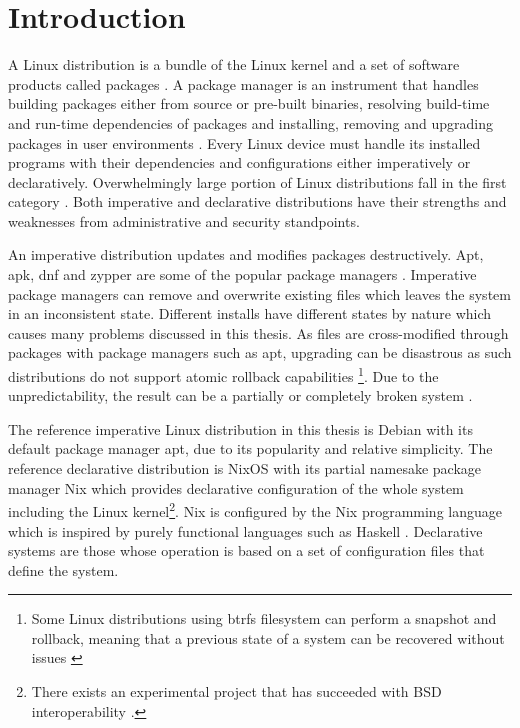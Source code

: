 \chapter{Introduction} \label{johdanto}

A Linux distribution is a bundle of the Linux kernel and a set of
software products called packages \cite{gnuPackagesx2014}.  A package
manager is an instrument that handles building packages either
from source or pre-built binaries, resolving build-time and run-time
dependencies of packages and installing, removing and upgrading
packages in user environments \cite{gnuPackagesx2014}. Every Linux
device must handle its installed programs with their dependencies and
configurations either imperatively or declaratively. Overwhelmingly
large portion of Linux distributions fall in the first category
\cite{dolstra2008nixos}. Both imperative and declarative distributions
have their strengths and weaknesses from administrative and security
standpoints.

An imperative distribution updates and modifies packages destructively. Apt,
apk, dnf and zypper are some of the popular package managers \cite{dolstra2008nixos}. Imperative package
managers can remove and overwrite existing files which leaves the
system in an inconsistent state. Different installs have
different states by nature which causes many problems discussed in this
thesis. As files are cross-modified through packages with package
managers such as apt, upgrading can be disastrous as such distributions
do not support atomic rollback capabilities \footnote{Some Linux
distributions using btrfs filesystem can perform a snapshot and
rollback, meaning that a previous state of a system can be recovered without issues \cite{opensuseSystemRecovery}}. Due to the unpredictability,
the result can be a partially or completely broken system
\cite{dolstra2008nixos}.

The reference imperative Linux distribution in this thesis is Debian
with its default package manager apt, due to its popularity and
relative simplicity. The reference declarative distribution is NixOS
with its partial namesake package manager Nix which provides
declarative configuration of the whole system including the Linux
kernel\footnote{There exists an experimental project that has
succeeded with BSD interoperability
\cite{githubGitHubNixosbsdnixbsd}.}. Nix is configured by the Nix
programming language which is inspired by purely functional languages
such as Haskell \cite{van2013reference}. Declarative systems are those whose operation is
based on a set of configuration files that define the system.

